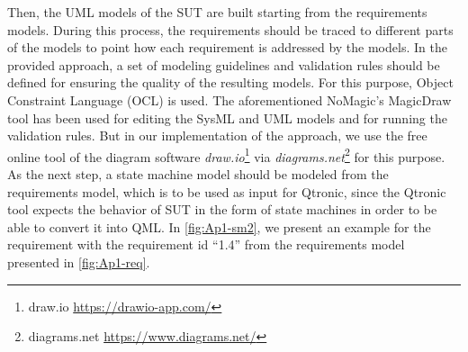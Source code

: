 Then, the UML models of the SUT are built starting from the requirements models. During this process, the requirements should be traced to different parts of the models to point how each requirement is addressed by the models. In the provided approach, a set of modeling guidelines and validation rules should be defined for ensuring the quality of the resulting models. For this purpose, Object Constraint Language (OCL) is used. The aforementioned NoMagic’s MagicDraw tool has been used for editing the SysML and UML models and for running the validation rules. But in our implementation of the approach, we use the free online tool of the diagram software \textit{draw.io}\footnote{draw.io \url{https://drawio-app.com/}} via \textit{diagrams.net}\footnote{diagrams.net \url{https://www.diagrams.net/}} for this purpose.
\newpage
As the next step, a state machine model should be modeled from the requirements model, which is to be used as input for Qtronic, since the Qtronic tool expects the behavior of SUT in the form of state machines in order to be able to convert it into QML. %
In \autoref{fig:Ap1-sm2}, we present an example for the requirement with the requirement id \enquote{1.4} from the requirements model presented in \autoref{fig:Ap1-req}.

